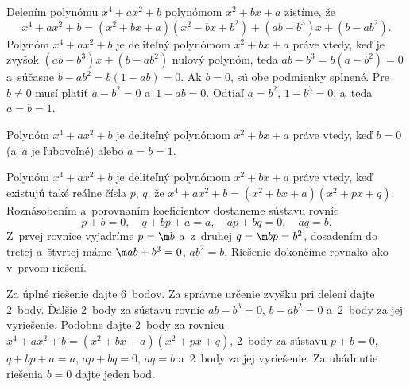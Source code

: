 {%
Delením polynómu $x^4+ax^2+b$ polynómom $x^2+bx+a$ zistíme, že
$$
x^4+ax^2+b=(x^2+bx+a)(x^2-bx+b^2)+(ab-b^3)x+(b-ab^2).
$$
Polynóm $x^4+ax^2+b$ je deliteľný polynómom $x^2+bx+a$ práve vtedy, keď je zvyšok $(ab-b^3)x+(b-ab^2)$ nulový polynóm, teda $ab-b^3=b(a-b^2)=0$ a~súčasne $b-ab^2=b(1-ab)=0$. Ak $b=0$, sú obe podmienky splnené. Pre $b\ne0$ musí platiť $a-b^2=0$ a~$1-ab=0$. Odtiaľ $a=b^2$, $1-b^3=0$, a~teda $a=b=1$.

\zaver
Polynóm $x^4+ax^2+b$ je deliteľný polynómom $x^2+bx+a$ práve vtedy, keď $b=0$ (a~$a$ je ľubovoľné) alebo $a=b=1$.

\ineriesenie
Polynóm $x^4+ax^2+b$ je deliteľný polynómom $x^2+bx+a$ práve vtedy, keď existujú také reálne čísla $p$, $q$, že $x^4+ax^2+b=(x^2+bx+a)(x^2+px+q)$. Roznásobením a~porovnaním koeficientov dostaneme sústavu rovníc
$$
p+b=0,\quad q+bp+a=a,\quad ap+bq=0,\quad aq=b.
$$
Z~prvej rovnice vyjadríme $p=\m b$ a~z~druhej $q=\m bp=b^2$, dosadením do tretej a~štvrtej máme $\m ab+b^3=0$, $ab^2=b$. Riešenie dokončíme rovnako ako v~prvom riešení.

\nobreak\medskip\petit\noindent
Za úplné riešenie dajte 6~bodov. 
Za správne určenie zvyšku pri delení dajte 2~body. Ďalšie 2~body za sústavu rovníc $ab-b^3=0$, $b-ab^2=0$ a~2~body za jej vyriešenie. 
Podobne dajte 2~body za rovnicu $x^4+ax^2+b=(x^2+bx+a)(x^2+px+q)$, 2~body za sústavu $p+b=0$, $q+bp+a=a$, $ap+bq=0$, $aq=b$ a~2~body za jej vyriešenie. Za uhádnutie riešenia $b=0$ dajte jeden bod.
\endpetit
\bigbreak
}

